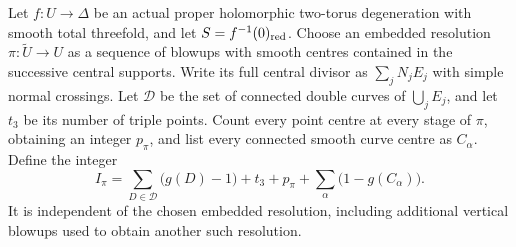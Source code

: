 
\begin{proposition}\label{cdp:st:C.2.UN.39}
Let $f:U\to\Delta$ be an actual proper holomorphic
two-torus degeneration with smooth total threefold,
and let $S=f^{-1}(0)_{\rm red}$. Choose an embedded
resolution $\pi:\widetilde U\to U$ as a sequence
of blowups with smooth centres contained in the
successive central supports. Write its full
central divisor as $\sum_jN_jE_j$ with simple
normal crossings. Let $\mathcal D$ be the set
of connected double curves of $\bigcup_jE_j$,
and let $t_3$ be its number of triple points.
Count every point centre at every stage of
$\pi$, obtaining an integer $p_\pi$, and list
every connected smooth curve centre as $C_\alpha$.
Define the integer
\[
 I_\pi=
     \sum_{D\in\mathcal D}\bigl(g(D)-1\bigr)+t_3
       +p_\pi+\sum_\alpha\bigl(1-g(C_\alpha)\bigr).
                                                               \tag{C.ZC.1}\label{cdp:eq:C.ZC.1}
\]
It is independent of the chosen embedded
resolution, including additional vertical
blowups used to obtain another such resolution.


\end{proposition}
